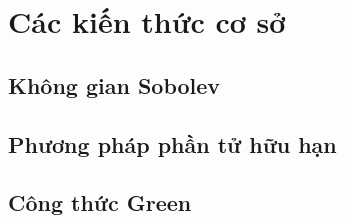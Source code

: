 \chapter{Các kiến thức cơ sở} \label{chap:fundamental}
\minitoc
\section{Không gian Sobolev}

\section{Phương pháp phần tử hữu hạn}

\section{Công thức Green}